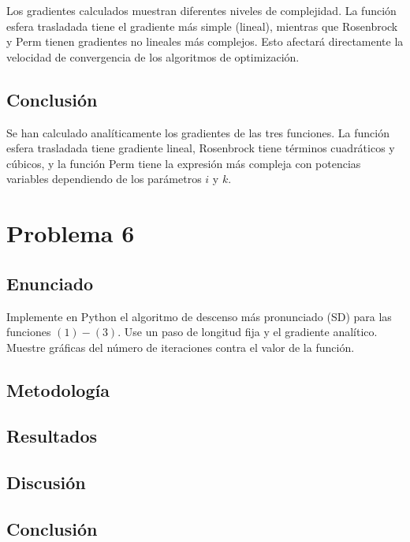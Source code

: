 \documentclass{article}
\begin{document}
Los gradientes calculados muestran diferentes niveles de complejidad. La función esfera trasladada tiene el gradiente más simple (lineal), mientras que Rosenbrock y Perm tienen gradientes no lineales más complejos. Esto afectará directamente la velocidad de convergencia de los algoritmos de optimización.

\subsection{Conclusión}

Se han calculado analíticamente los gradientes de las tres funciones. La función esfera trasladada tiene gradiente lineal, Rosenbrock tiene términos cuadráticos y cúbicos, y la función Perm tiene la expresión más compleja con potencias variables dependiendo de los parámetros $i$ y $k$.

\section{Problema 6}

\subsection{Enunciado}
Implemente en Python el algoritmo de descenso más pronunciado (SD) para las funciones $ (1)-(3) $. Use un paso de longitud fija y el gradiente analítico. Muestre gráficas del número de iteraciones contra el valor de la función.

\subsection{Metodología}

\subsection{Resultados}
\setcounter{equation}{0}

\subsection{Discusión}

\subsection{Conclusión}

\end{document}
